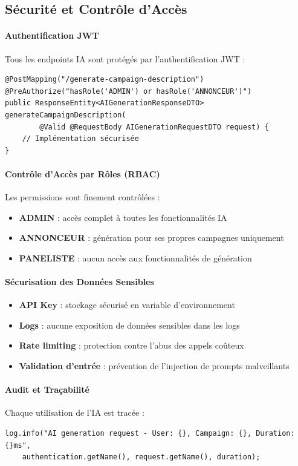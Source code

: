 \subsection{Sécurité et Contrôle d'Accès}

\paragraph{Authentification JWT}
Tous les endpoints IA sont protégés par l'authentification JWT :
\begin{verbatim}
@PostMapping("/generate-campaign-description")
@PreAuthorize("hasRole('ADMIN') or hasRole('ANNONCEUR')")
public ResponseEntity<AIGenerationResponseDTO> generateCampaignDescription(
        @Valid @RequestBody AIGenerationRequestDTO request) {
    // Implémentation sécurisée
}
\end{verbatim}

\paragraph{Contrôle d'Accès par Rôles (RBAC)}
Les permissions sont finement contrôlées :
\begin{itemize}[label=\textbullet]
    \item \textbf{ADMIN} : accès complet à toutes les fonctionnalités IA
    \item \textbf{ANNONCEUR} : génération pour ses propres campagnes uniquement
    \item \textbf{PANELISTE} : aucun accès aux fonctionnalités de génération
\end{itemize}

\paragraph{Sécurisation des Données Sensibles}
\begin{itemize}[label=\textbullet]
    \item \textbf{API Key} : stockage sécurisé en variable d'environnement
    \item \textbf{Logs} : aucune exposition de données sensibles dans les logs
    \item \textbf{Rate limiting} : protection contre l'abus des appels coûteux
    \item \textbf{Validation d'entrée} : prévention de l'injection de prompts malveillants
\end{itemize}

\paragraph{Audit et Traçabilité}
Chaque utilisation de l'IA est tracée :
\begin{verbatim}
log.info("AI generation request - User: {}, Campaign: {}, Duration: {}ms",
    authentication.getName(), request.getName(), duration);
\end{verbatim}

